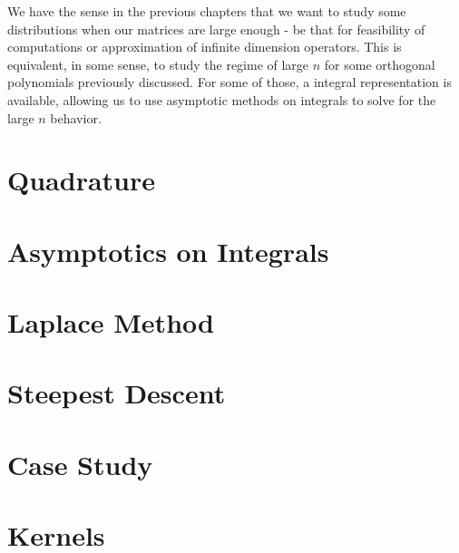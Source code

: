 We have the sense in the previous chapters that we want to study some distributions when our matrices are large enough - be that for feasibility of computations or approximation of infinite dimension operators. This is equivalent, in some sense, to study the regime of large $n$ for some orthogonal polynomials previously discussed. For some of those, a integral representation is available, allowing us to use asymptotic methods on integrals to solve for the large $n$ behavior.

\section{Quadrature}

 

\section{Asymptotics on Integrals}


\section{Laplace Method}
\label{Section: Laplace Method}


\section{Steepest Descent}


\section{Case Study}



\section{Kernels}


